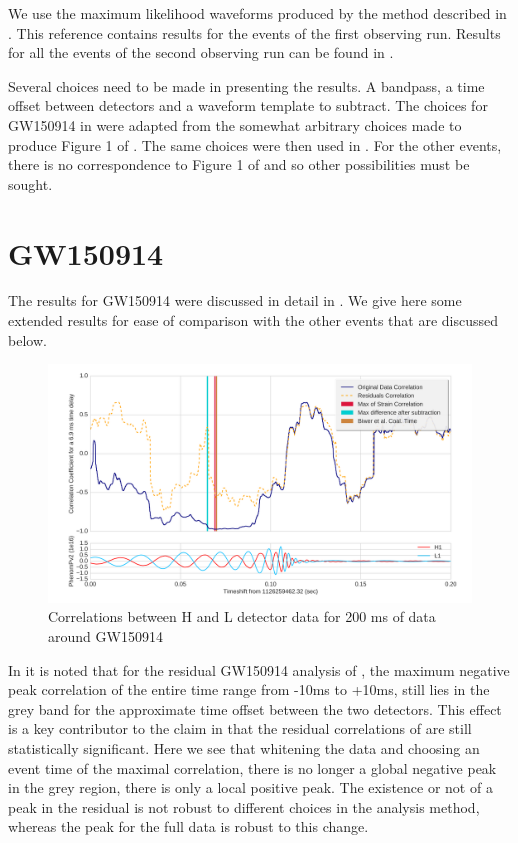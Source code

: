 \documentclass[a4paper,11pt]{article}
\begin{document}
We use the maximum likelihood waveforms produced by the method described in \cite{Biwer:2018osg}. This reference contains results for the events of the first observing run. Results for all the events of the second observing run can be found in \cite{De:2018zrk}.

Several choices need to be made in presenting the results. A bandpass, a time offset between detectors and a waveform template to subtract. The choices for GW150914 in \cite{Creswell:2017rbh} were adapted from the somewhat arbitrary choices made to produce  Figure 1 of \cite{Abbott:2016blz}. The same choices were then used in \cite{Nielsen:2018bhc}. For the other events, there is no correspondence to Figure 1 of \cite{Abbott:2016blz} and so other possibilities must be sought. 

\section{GW150914}

The results for GW150914 were discussed in detail in \cite{Nielsen:2018bhc}. We give here some extended results for ease of comparison with the other events that are discussed below.

\begin{figure}[]
  \centering
    \includegraphics[width=\columnwidth]{GW150914CorrVsTime.png}
\caption{Correlations between H and L detector data for 200 ms of data around GW150914}
\label{fig:150914corr}
\end{figure}

In \cite{Jackson:2019xbq} it is noted that for the residual GW150914 analysis of \cite{Nielsen:2018bhc}, the maximum negative peak correlation of the entire time range from -10ms to +10ms, still lies in the grey band for the approximate time offset between the two detectors. This effect is a key contributor to the claim in \cite{Jackson:2019xbq} that the residual correlations of \cite{Nielsen:2018bhc} are still statistically significant. Here we see that whitening the data and choosing an event time of the maximal correlation, there is no longer a global negative peak in the grey region, there is only a local positive peak. The existence or not of a peak in the residual is not robust to different choices in the analysis method, whereas the peak for the full data is robust to this change.
\end{document}
